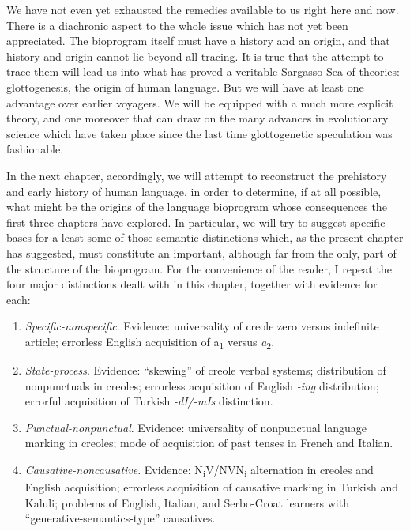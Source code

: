 We have not even yet exhausted the remedies available to us right here and now. There is a diachronic aspect to the whole issue which has not yet been appreciated. The bioprogram itself must have a history and an origin, and that history and origin cannot lie beyond all tracing. It is true that the attempt to trace them will lead us into what has proved a veritable Sargasso Sea of theories: glottogenesis, the origin of human language. But we will have at least one advantage over earlier voyagers. We will be equipped with a much more explicit theory, and one moreover that can draw on the many advances in evolutionary science which have taken place since the last time glottogenetic speculation was fashionable.


In the next chapter, accordingly, we will attempt to reconstruct the prehistory and early history of human language, in order to determine, if at all possible, what might be the origins of the language bioprogram whose consequences the first three chapters have explored. In particular, we will try to suggest specific bases for a least some of those semantic distinctions which, as the present chapter has suggested, must constitute an important, although far from the only, part of the structure of the bioprogram. For the convenience of the reader, I repeat the four major distinctions dealt with in this chapter, together with evidence for each: 

\begin{enumerate}
	
\item\textit{Specific-nonspecific}. Evidence: universality of creole zero versus indefinite article; errorless English acquisition of a\textsubscript{1} versus \textit{a}\textsubscript{2}.

\item\textit{State-process}. Evidence: ``skewing'' of creole verbal systems; distribution of nonpunctuals in creoles; errorless acquisition of English \textit{-ing} distribution; errorful acquisition of Turkish \textit{-dI/-mIs} distinction. 

\item\textit{Punctual-nonpunctual}. Evidence: universality of nonpunctual language marking in creoles; mode of acquisition of past tenses in French and Italian. 

\item\textit{Causative-noncausative}. Evidence: N\textsubscript{i}V/NVN\textsubscript{i} alternation in creoles and English acquisition; errorless acquisition of causative marking in Turkish and Kaluli; problems of English, Italian, and Serbo-Croat learners with ``generative-semantics-type'' causatives. 
\end{enumerate}

